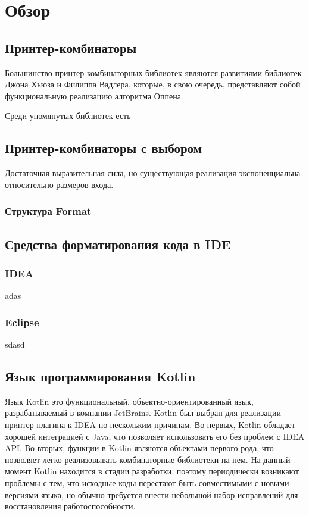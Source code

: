 \section{Обзор}

\subsection{Принтер-комбинаторы}

Большинство принтер-комбинаторных библиотек\cite{
swierstraChitil, swierstra04, peytonJones, kiselyov, chitil, swiComb}
являются развитиями библиотек
Джона Хьюза\cite{hughes} и Филиппа Вадлера\cite{wadler}, которые,
в свою очередь, представляют собой функциональную реализацию алгоритма
Оппена\cite{oppen}.

Среди упомянутых библиотек есть 


\subsection{Принтер-комбинаторы с выбором}
Достаточная выразительная сила, но существующая реализация экспоненциальна
относительно размеров входа.

\subsubsection{Структура Format}

\subsection{Средства форматирования кода в IDE}

\subsubsection{IDEA}
adas
\subsubsection{Eclipse}
sdasd



\subsection{Язык программирования Kotlin}

Язык Kotlin это функциональный, объектно-ориентированный язык,
разрабатываемый в компании JetBrains.
Kotlin был выбран для реализации принтер-плагина к IDEA по нескольким причинам. 
Во-первых, Kotlin обладает хорошей интеграцией с Java, что позволяет
использовать его без проблем с IDEA API. 
Во-вторых, функции в Kotlin являются объектами первого рода, что позволяет
легко реализовывать комбинаторные библиотеки на нем.
На данный момент Kotlin находится в стадии разработки, поэтому
периодически возникают
проблемы с тем, что исходные коды перестают быть совместимыми с новыми
версиями языка,
но обычно требуется внести небольшой набор исправлений для
восстановления работоспособности.
